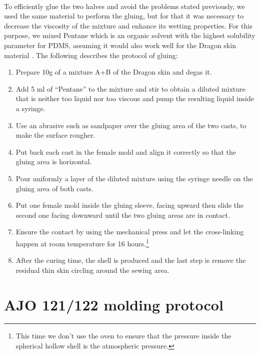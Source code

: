 \paragraph{} 
To efficiently glue the two halves and avoid the problems stated previously, we used the same material to perform the gluing, but for that it was necessary to decrease the viscosity of the mixture and enhance its wetting properties. For this purpose, we mixed Pentane which is an organic solvent \cite{NgLee2003} with the highest solubility parameter for PDMS, assuming it would also work well for the Dragon skin material .
The following describes the protocol of gluing:
\begin{enumerate}
	\item Prepare 10g of a mixture A+B of the Dragon skin and degas it.
	\item Add 5 ml of "`Pentane"' to the mixture and stir to obtain a diluted mixture that is neither too liquid nor too viscous and pump the resulting liquid inside a syringe.
	\item Use an abrasive such as sandpaper over the gluing area of the two casts, to make the surface rougher.
	\item Put back each cast in the female mold and align it correctly so that the gluing area is horizontal.
	\item Pour uniformly a layer of the diluted mixture using the syringe needle on the gluing area of both casts.
	\item Put one female mold inside the gluing sleeve, facing upward then slide the second one facing downward until the two gluing areas are in contact.
	\item Ensure the contact by using the mechanical press and let the cross-linking happen at room temperature for 16 hours.\footnote{This time we don't use the oven to ensure that the pressure inside the spherical hollow shell is the atmospheric pressure.}
	\item After the curing time, the shell is produced and the last step is remove the residual thin skin circling around the sewing area.
\end{enumerate}



\section{AJO 121/122 molding protocol}
